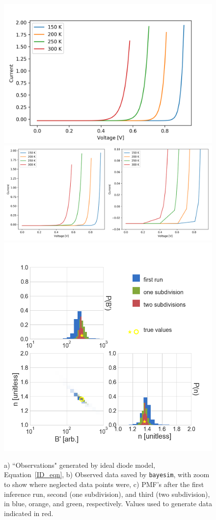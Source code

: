 \documentclass[aps,prl,amsmath,amssymb,superscriptaddress,notitlepage,groupedaddress]{revtex4-1}
\begin{document}
    \begin{figure}
      \includegraphics[width=0.33\columnwidth]{diode_obs.png}
      \includegraphics[width=0.45\columnwidth]{diode_obs_zoom.png}
      \includegraphics[width=0.8\columnwidth]{diode_pmf_comp.png}
      \caption{a) ``Observations" generated by ideal diode model, Equation~\ref{ID_eqn}, b) Observed data saved by \texttt{bayesim}, with zoom to show where neglected data points were, c) PMF's after the first inference run, second (one subdivision), and third (two subdivision), in blue, orange, and green, respectively. Values used to generate data indicated in red.}
      \label{ID_data}
    \end{figure}
\end{document}
